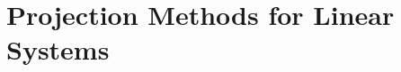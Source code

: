 \documentclass[../main.tex]{subfiles}
\begin{document}
\part{Projection Methods for Linear Systems}\label{part:projections}


\end{document}
